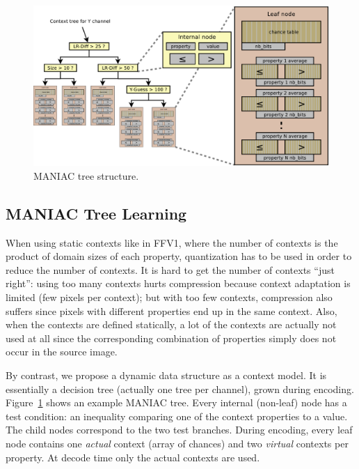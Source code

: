 \documentclass{article}
\begin{document}
\begin{figure}
\includegraphics[width=\linewidth]{images/context_tree}
\caption{MANIAC tree structure.}
\label{fig:context_tree}
\end{figure}

\subsection{MANIAC Tree Learning}
\label{sec:context_tree}

When using static contexts like in FFV1, where the number of contexts is the product of
domain sizes of each property, quantization has to be used in order to reduce
the number of contexts. It is hard to get the number of contexts ``just right'':
using too many contexts %
hurts compression because context adaptation is limited
(few pixels per context);
but with too few contexts, compression also suffers
since pixels with different properties end up in the same context.
Also, when the contexts are defined statically,
a lot of the contexts are actually not used at all since the corresponding
combination of properties simply does not occur in the source image.




By contrast, we propose a dynamic data structure as a context model. It is essentially
a decision tree (actually one tree per channel), grown during encoding.
Figure~\ref{fig:context_tree} shows an example MANIAC tree.
%
Every internal (non-leaf) node has a test condition: an inequality comparing one of the context properties
to a value. The child nodes correspond to the two test branches.
During encoding, every leaf node contains one {\it actual} context (array of chances)
and two {\it virtual} contexts per property. %
At decode time only the actual contexts are used.
\end{document}
